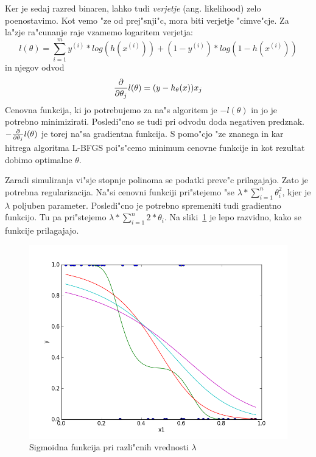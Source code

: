 \documentclass[a4paper,11pt]{article}
\begin{document}
Ker je sedaj razred binaren, lahko tudi \textit{verjetje} (ang. likelihood) zelo poenostavimo. Kot vemo "ze od prej"snji"c, mora biti verjetje "cimve"cje. Za la"zje ra"cunanje raje vzamemo logaritem verjetja:
\[l(\theta) = \sum_{i=1}^my^{(i)}*log(h(x^{(i)})) + (1-y^{(i)})*log(1-h(x^{(i)}))\]
in njegov odvod 
\[{\partial\over{\partial\theta_j}}l(\theta) = (y-h_\theta(x))x_j\]
Cenovna funkcija, ki jo potrebujemo za na"s algoritem je $-l(\theta)$ in jo je potrebno minimizirati. Posledi"cno se tudi pri odvodu doda negativen predznak. $-{\partial\over{\partial\theta_j}}l(\theta)$ je torej na"sa gradientna funkcija. S pomo"cjo "ze znanega in kar hitrega algoritma L-BFGS poi"s"cemo minimum cenovne funkcije in kot rezultat dobimo optimalne $\theta$.

Zaradi simuliranja vi"sje stopnje polinoma se podatki preve"c prilagajajo. Zato je potrebna regularizacija. Na"si cenovni funkciji pri"stejemo "se $\lambda * \sum_{i=1}^n\theta_i^2$, kjer je $\lambda$ poljuben parameter. Posledi"cno je potrebno spremeniti tudi gradientno funkcijo. Tu pa pri"stejemo $\lambda * \sum_{i=1}^n2*\theta_i$. Na sliki~\ref{slika1} je lepo razvidno, kako se funkcije prilagajajo.

\begin{figure}[h!]
\begin{center}
\includegraphics[scale=0.6]{slika1}
\caption{Sigmoidna funkcija pri razli"cnih vrednosti $\lambda$}
\label{slika1}
\end{center}
\end{figure}

\pagebreak
\end{document}
